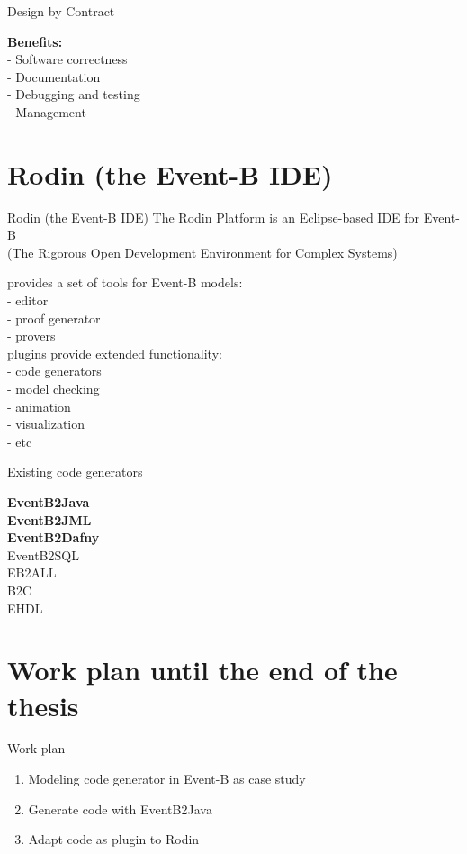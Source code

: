 \documentclass{beamer}
\begin{document}
  \begin{frame}{Design by Contract}

      \textbf{Benefits:}\\
      - Software correctness\\
      - Documentation\\
      - Debugging and testing\\
      - Management

  \end{frame}

  \section{Rodin (the Event-B IDE)}

  \begin{frame}{Rodin (the Event-B IDE)}
    The Rodin Platform is an Eclipse-based IDE for Event-B\\
    {\footnotesize \color{black!40}
      (The Rigorous Open Development Environment for Complex Systems)
    }

    provides a set of tools for Event-B models:\\
    - editor\\
    - proof generator\\
    - provers\\
    plugins provide extended functionality:\\
    - code generators\\
    - model checking\\
    - animation\\
    - visualization\\
    - etc

  \end{frame}

  \begin{frame}{Existing code generators}

    \textbf{EventB2Java}\\
    \textbf{EventB2JML}\\
    \textbf{EventB2Dafny}\\
    EventB2SQL\\
    EB2ALL \\
    B2C \\
    EHDL \\

  \end{frame}

  \section{Work plan until the end of the thesis}

  \begin{frame}{Work-plan}
    \begin{enumerate}
      \item Modeling code generator in Event-B as case study
      \item Generate code with EventB2Java
      \item Adapt code as plugin to Rodin
    \end{enumerate}
  \end{frame}
\end{document}
